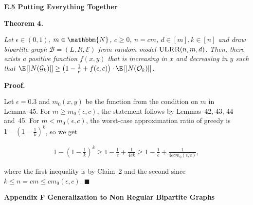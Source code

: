 \documentclass[10pt,a4paper]{article}
\begin{document}
\par\medskip\noindent\textbf{E.5 Putting Everything Together}\par





\par\medskip\noindent\textbf{\textbf{Theorem 4}\textbf{.}}\par



\emph{Let $\epsilon\in(0,1)$, $m\in\mathbbm{N}$, $c\geq 0$, $n=cm$, $d\in[m],k\in[n]$ and draw bipartite graph $\mathcal{B}=(L,R,\mathcal{E})$ from random model $\textsc{ULRR}(n,m,d)$.
Then, there exists a positive function $f(x,y)$ that is increasing in $x$ and decreasing in $y$ such that $\E\left[|N(\mathcal{G}_{k})|\right]\geq\left(1-\frac{1}{e}+f(\epsilon,c)\right)\cdot\E\left[|N(\mathcal{O}_{k})|\right]$.}\par






\par\medskip\noindent\textbf{Proof.}\par



Let $\epsilon=0.3$ and $m_{0}(x,y)$ be the function from the condition on $m$ in Lemma 45.
For $m\geq m_{0}(\epsilon,c)$, the statement follows by Lemmas 42, 43, 44 and 45.
For $m<m_{0}(\epsilon,c)$, the worst-case approximation ratio of greedy is $1-\left(1-\frac{1}{k}\right)^{k}$, so we get\par


\[\begin{gathered}
\displaystyle 1-\left(1-\frac{1}{k}\right)^{k}\geq 1-\frac{1}{e}+\frac{1}{4ek}\geq 1-\frac{1}{e}+\frac{1}{4ecm_{0}(\epsilon,c)},
\end{gathered}\]


where the first inequality is by Claim 2 and the second since $k\leq n=cm\leq cm_{0}(\epsilon,c)$.
\ensuremath{\blacksquare}\par







\par\medskip\noindent\textbf{Appendix F Generalization to Non Regular Bipartite Graphs}\par
\end{document}
